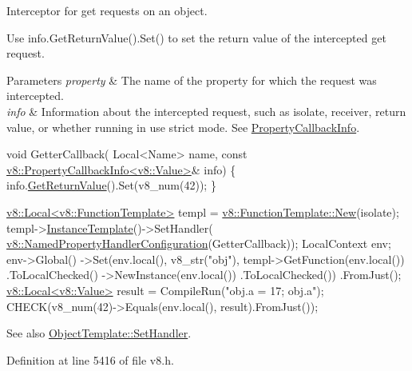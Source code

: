 Interceptor for get requests on an object.

Use {\ttfamily info.\+Get\+Return\+Value().Set()} to set the return value of the intercepted get request.


\begin{DoxyParams}{Parameters}
{\em property} & The name of the property for which the request was intercepted. \\
\hline
{\em info} & Information about the intercepted request, such as isolate, receiver, return value, or whether running in {\ttfamily \textquotesingle{}use strict}\textquotesingle{} mode. See {\ttfamily \mbox{\hyperlink{classv8_1_1PropertyCallbackInfo}{Property\+Callback\+Info}}}.\\
\hline
\end{DoxyParams}

\begin{DoxyCode}
\textcolor{keywordtype}{void} GetterCallback(
  Local<Name> name,
  \textcolor{keyword}{const} \mbox{\hyperlink{classv8_1_1PropertyCallbackInfo}{v8::PropertyCallbackInfo<v8::Value>}}& info) \{
    info.\mbox{\hyperlink{classv8_1_1PropertyCallbackInfo_aa0882946929c3c4df6d131fe0d8d6746}{GetReturnValue}}().Set(v8\_num(42));
\}

\mbox{\hyperlink{classv8_1_1Local}{v8::Local<v8::FunctionTemplate>}} templ =
    \mbox{\hyperlink{classv8_1_1FunctionTemplate_a55e3cc6d55e3cb089c49c7616fcb39f5}{v8::FunctionTemplate::New}}(isolate);
templ->\mbox{\hyperlink{classv8_1_1FunctionTemplate_acc7ec612c5eb38e5f76f75eaf1efd776}{InstanceTemplate}}()->SetHandler(
    \mbox{\hyperlink{structv8_1_1NamedPropertyHandlerConfiguration}{v8::NamedPropertyHandlerConfiguration}}(GetterCallback));
LocalContext env;
env->Global()
    ->Set(env.local(), v8\_str(\textcolor{stringliteral}{"obj"}), templ->GetFunction(env.local())
                                           .ToLocalChecked()
                                           ->NewInstance(env.local())
                                           .ToLocalChecked())
    .FromJust();
\mbox{\hyperlink{classv8_1_1Local}{v8::Local<v8::Value>}} result = CompileRun(\textcolor{stringliteral}{"obj.a = 17; obj.a"});
CHECK(v8\_num(42)->Equals(env.local(), result).FromJust());
\end{DoxyCode}


See also {\ttfamily \mbox{\hyperlink{classv8_1_1ObjectTemplate_a3d5666f1e9b0f46df6b4dbb7cfbb6114}{Object\+Template\+::\+Set\+Handler}}}. 

Definition at line 5416 of file v8.\+h.

